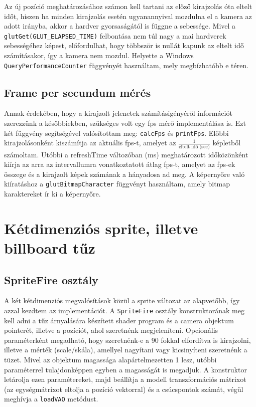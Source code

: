 Az új pozíció meghatározásához számon kell tartani az előző kirajzolás óta eltelt időt, hiszen ha minden kirajzolás esetén ugyanannyival mozdulna el a kamera az adott irányba, akkor a hardver gyorsaságától is függne a sebessége. Mivel a \texttt{glutGet(GLUT\_ELAPSED\_TIME)} felbontása nem túl nagy a mai hardverek sebességéhez képest, előfordulhat, hogy többször is nullát kapunk az eltelt idő számításakor, így a kamera nem mozdul. Helyette a Windows \texttt{QueryPerformanceCounter} függvényét használtam, mely megbízhatóbb e téren.

\subsection{Frame per secundum mérés}

Annak érdekében, hogy a kirajzolt jelenetek számításigényéről információt szerezzünk a későbbiekben, szükséges volt egy fps mérő implementálása is. Ezt két függvény segítségével valósítottam meg: \texttt{calcFps} és \texttt{printFps}. Előbbi kirajzolásonként kiszámítja az aktuális fps-t, amelyet az $\frac{1}{\text{eltelt idő (sec)}}$ képletből számoltam. Utóbbi a refreshTime változóban (ms) meghatározott időközönként kiírja az arra az intervallumra vonatkoztatott átlag fps-t, amelyet az fps-ek összege és a kirajzolt képek számának a hányadosa ad meg. A képernyőre való kiíratáshoz a \texttt{glutBitmapCharacter} függvényt használtam, amely bitmap karaktereket ír ki a képernyőre. 

\section{Kétdimenziós sprite, illetve billboard tűz}

\subsection{SpriteFire osztály}

A két kétdimenziós megvalósítások közül a sprite változat az alapvetőbb, így azzal kezdtem az implementációt. A \texttt{SpriteFire} osztály konstruktorának meg kell adni a tűz árnyalására készített shader program és a camera objektum pointerét, illetve a pozíciót, ahol szeretnénk megjeleníteni. Opcionális paraméterként megadható, hogy szeretnénk-e a 90 fokkal elfordítva is kirajzolni, illetve a mérték (scale/skála), amellyel nagyítani vagy kicsinyíteni szeretnénk a tüzet. Mivel az objektum magassága alapártelmezetten 1 lesz, utóbbi paraméterrel tulajdonképpen egyben a magasságát is megadjuk. A konstruktor letárolja ezen paramétereket, majd beállítja a modell transzformációs mátrixot (az egységmátrixot eltolja a pozíció vektorral) és a csúcspontok számát, végül meghívja a \texttt{loadVAO} metódust.

